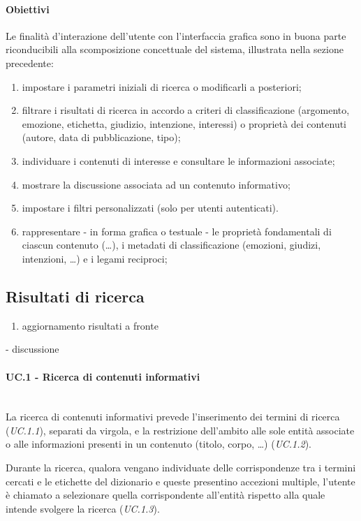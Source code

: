 \paragraph{Obiettivi}
Le finalità d'interazione dell'utente con l'interfaccia grafica sono in buona parte riconducibili alla scomposizione concettuale del sistema, illustrata nella sezione precedente:
\begin{enumerate}
	\item impostare i parametri iniziali di ricerca o modificarli a posteriori;
	\item filtrare i risultati di ricerca in accordo a criteri di classificazione (argomento, emozione, etichetta, giudizio, intenzione, interessi) o proprietà dei contenuti (autore, data di pubblicazione, tipo);
	\item individuare i contenuti di interesse e consultare le informazioni associate;
	\item mostrare la discussione associata ad un contenuto informativo;
	\item impostare i filtri personalizzati (solo per utenti autenticati).
	\item rappresentare - in forma grafica o testuale - le proprietà fondamentali di ciascun contenuto (\ldots), i metadati di classificazione (emozioni, giudizi, intenzioni, \ldots) e i legami reciproci;
\end{enumerate}
 
\subsection{Risultati di ricerca}
\begin{enumerate}
	\item aggiornamento risultati a fronte
\end{enumerate}
- discussione
\paragraph{UC.1 - Ricerca di contenuti informativi} \hfill \\
La ricerca di contenuti informativi prevede l'inserimento dei termini di ricerca (\textit{UC.1.1}), separati da virgola, e la restrizione dell'ambito alle sole entità associate o alle informazioni presenti in un contenuto (titolo, corpo, \ldots) (\textit{UC.1.2}).

Durante la ricerca, qualora vengano individuate delle corrispondenze tra i termini cercati e le etichette del dizionario e queste presentino accezioni multiple, l'utente è chiamato a selezionare quella corrispondente all'entità rispetto alla quale intende svolgere la ricerca (\textit{UC.1.3}).

